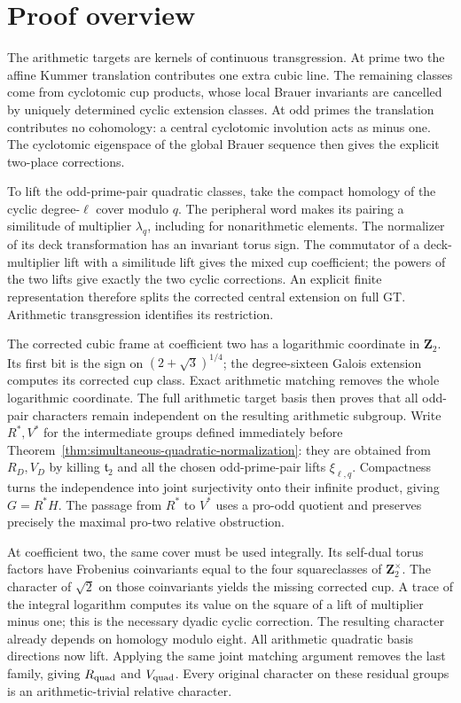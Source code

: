 \documentclass[11pt,a4paper]{article}
\theoremstyle{definition}
\theoremstyle{remark}
\newcommand{\Z}{\mathbf Z}
\begin{document}
\section{Proof overview}
The arithmetic targets are kernels of continuous transgression. At
prime two the affine Kummer translation contributes one extra cubic
line. The remaining classes come from cyclotomic cup products, whose
local Brauer invariants are cancelled by uniquely determined cyclic
extension classes. At odd primes the translation contributes no
cohomology: a central cyclotomic involution acts as minus one.
The cyclotomic eigenspace of the global Brauer sequence then gives
the explicit two-place corrections.

To lift the odd-prime-pair quadratic classes, take the compact homology
of the cyclic degree-\(\ell\) cover modulo \(q\). The peripheral word
makes its pairing a similitude of multiplier \(\lambda_q\), including
for nonarithmetic elements. The normalizer of its deck transformation
has an invariant torus sign. The commutator of a deck-multiplier lift
with a similitude lift gives the mixed cup coefficient; the powers
of the two lifts give exactly the two cyclic corrections. An explicit
finite representation therefore splits the corrected central extension
on full GT. Arithmetic transgression identifies its restriction.

The corrected cubic frame at coefficient two has a logarithmic
coordinate in \(\Z_2\). Its first bit is the sign on
\((2+\sqrt3)^{1/4}\); the degree-sixteen Galois extension computes
its corrected cup class. Exact arithmetic matching removes the whole
logarithmic coordinate. The full arithmetic target basis then proves
that all odd-pair characters remain independent on the resulting
arithmetic subgroup. Write \(R^*,V^*\) for the intermediate groups
defined immediately before
Theorem~\ref{thm:simultaneous-quadratic-normalization}: they are
obtained from \(R_D,V_D\) by killing \(\mathfrak t_2\) and all the
chosen odd-prime-pair lifts \(\xi_{\ell,q}\).
Compactness turns the independence into joint surjectivity onto their
infinite product, giving \(G=R^*H\).
The passage from \(R^*\) to \(V^*\) uses a pro-odd quotient and
preserves precisely the maximal pro-two relative obstruction.

At coefficient two, the same cover must be used integrally. Its
self-dual torus factors have Frobenius coinvariants equal to the four
squareclasses of \(\Z_2^\times\). The character of \(\sqrt2\)
on those coinvariants yields the missing corrected cup. A trace of the
integral logarithm computes its value on the square of a lift of
multiplier minus one; this is the necessary dyadic cyclic correction.
The resulting character already depends on homology modulo eight.
All arithmetic quadratic basis directions now lift. Applying the same
joint matching argument removes the last family, giving
\(R_{\rm quad}\) and \(V_{\rm quad}\). Every original character
on these residual groups is an arithmetic-trivial relative character.
\end{document}
